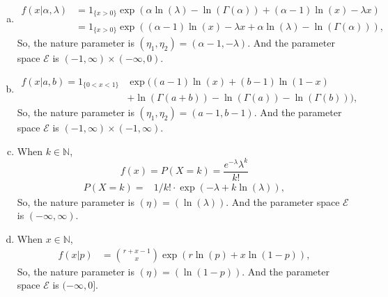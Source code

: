 \begin{solution}
	\begin{enumerate}[(a)]
		\item
		\[
			\begin{aligned}
				f(x|\alpha, \lambda)&=1_{\{x>0\}}\exp(\alpha\ln(\lambda)-\ln(\Gamma(\alpha))+(\alpha-1)\ln(x)-\lambda x)\\
				&=1_{\{x>0\}}\exp((\alpha-1)\ln(x)-\lambda x+\alpha\ln(\lambda)-\ln(\Gamma(\alpha))),
			\end{aligned}
		\]
		So, the nature parameter is $(\eta_1,\eta_2)=(\alpha-1, -\lambda)$. And the parameter space \(\mathcal{E}\) is \((-1,\infty)\times(-\infty,0)\).
		\item
		\[
			\begin{aligned}
				f(x|a,b)=1_{\{0<x<1\}}&\exp((a-1)\ln(x)+(b-1)\ln(1-x)\\&+\ln(\Gamma(a+b))-\ln(\Gamma(a))-\ln(\Gamma(b))),
			\end{aligned}
		\]
		So, the nature parameter is $(\eta_1,\eta_2)=(a-1, b-1)$. And the parameter space \(\mathcal{E}\) is \((-1,\infty)\times(-1,\infty)\).
		\item When \(k\in\mathbb{N}\),
		\[
			f(x)=P(X=k)=\frac{e^{-\lambda}\lambda^k}{k!}
		\]
		\[
			\begin{aligned}
				P(X=k)=&1/k!\cdot\exp(-\lambda+k\ln(\lambda)),
			\end{aligned}
		\]
		So, the nature parameter is $(\eta)=(\ln(\lambda))$. And the parameter space \(\mathcal{E}\) is \((-\infty,\infty)\).
		\item When \(x\in\mathbb{N}\),
		\[
			\begin{aligned}
				f(x|p)&=\binom{r+x-1}{x}\exp\left(r\ln(p)+x\ln(1-p)\right),
			\end{aligned}
		\]
		So, the nature parameter is $(\eta)=(\ln(1-p))$. And the parameter space \(\mathcal{E}\) is \((-\infty,0]\).
	\end{enumerate}
\end{solution}

